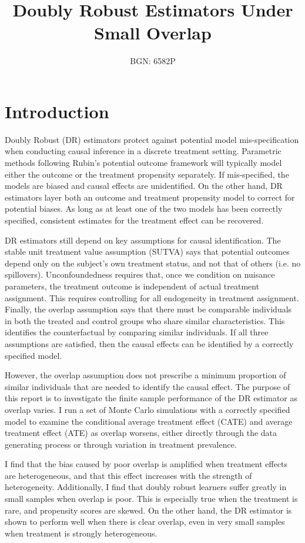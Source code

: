 \documentclass[12pt, oneside]{article}   	%
\title{\textbf{Doubly Robust Estimators Under Small Overlap}}
\author{BGN: 6582P}
\date{}
\begin{document}
\onehalfspacing
\maketitle

\section{Introduction}
Doubly Robust (DR) estimators protect against potential model mis-specification when conducting causal inference in a discrete treatment setting. Parametric methods following Rubin’s potential outcome framework will typically model either the outcome or the treatment propensity separately. If mis-specified, the models are biased and causal effects are unidentified. On the other hand, DR estimators layer both an outcome and treatment propensity model to correct for potential biases. As long as at least one of the two models has been correctly specified, consistent estimates for the treatment effect can be recovered.

DR estimators still depend on key assumptions for causal identification. The stable unit treatment value assumption (SUTVA) says that potential outcomes depend only on the subject's own treatment status, and not that of others (i.e. no spillovers). Unconfoundedness requires that, once we condition on nuisance parameters, the treatment outcome is independent of actual treatment assignment. This requires controlling for all endogeneity in treatment assignment. Finally, the overlap assumption says that there must be comparable individuals in both the treated and control groups who share similar characteristics. This identifies the counterfactual by comparing similar individuals. If all three assumptions are satisfied, then the causal effects can be identified by a correctly specified model.

However, the overlap assumption does not prescribe a minimum proportion of similar individuals that are needed to identify the causal effect. The purpose of this report is to investigate the finite sample performance of the DR estimator as overlap varies. I run a set of Monte Carlo simulations with a correctly specified model to examine the conditional average treatment effect (CATE) and average treatment effect (ATE) as overlap worsens, either directly through the data generating process or through variation in treatment prevalence.

I find that the bias caused by poor overlap is amplified when treatment effects are heterogeneous, and that this effect increases with the strength of heterogeneity. Additionally, I find that doubly robust learners suffer greatly in small samples when overlap is poor. This is especially true when the treatment is rare, and propensity scores are skewed. On the other hand, the DR estimator is shown to perform well when there is clear overlap, even in very small samples when treatment is strongly heterogeneous.
\end{document}
